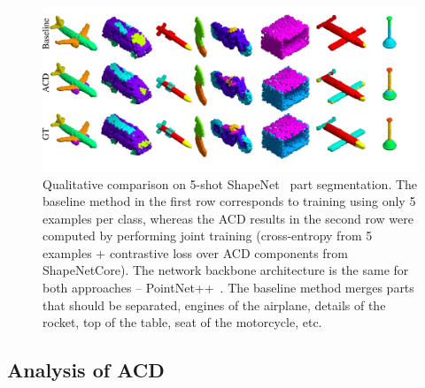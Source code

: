 \begin{figure}[t]
    \centering
    \includegraphics[width=\linewidth]{acd/imgs/segresults_noinput.pdf}
    \caption{\small{Qualitative comparison on 5-shot ShapeNet~\cite{Chang2015ShapeNetAI} part segmentation.
    The baseline method in the first row corresponds to training using only 5 examples per class,
    whereas the ACD results in the second row were computed by performing joint training (cross-entropy from 5 examples + contrastive loss over ACD components from ShapeNetCore).
    The network backbone architecture is the same for both approaches -- PointNet++~\cite{qi2017pointnetpp}.
    The baseline method merges parts that should be separated, \eg engines of the airplane,
    details of the rocket, top of the table, seat of the motorcycle, etc.}}
    \label{fig:segresults}
\end{figure}






\subsection{Analysis of ACD}


